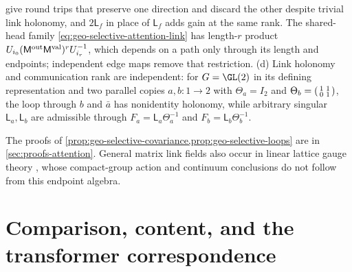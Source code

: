 give round trips that preserve one direction and discard the other despite
trivial link holonomy, and \(2\mathsf L_f\) in place of \(\mathsf L_f\) adds
gain at the same rank. The shared-head family
\eqref{eq:geo-selective-attention-link} has length-\(r\) product
\(U_{i_0}(\mathsf M^{\rm out}\mathsf M^{\rm val})^rU_{i_r}^{-1}\), which depends
on a path only through its length and endpoints; independent edge maps remove
that restriction. (d) Link holonomy and communication rank are independent: for
\(G=\GL(2)\) in its defining representation and two parallel copies
\(a,b:1\to2\) with \(\Theta_a=I_2\) and
\(\Theta_b=\begin{psmallmatrix}1&1\\0&1\end{psmallmatrix}\), the loop through
\(b\) and \(\bar a\) has nonidentity holonomy, while arbitrary singular
\(\mathsf L_a,\mathsf L_b\) are admissible through
\(F_a=\mathsf L_a\Theta_a^{-1}\) and \(F_b=\mathsf L_b\Theta_b^{-1}\).

The proofs of \cref{prop:geo-selective-covariance,prop:geo-selective-loops} are in \cref{sec:proofs-attention}.
General matrix link fields also occur in linear lattice gauge theory
\citep{Wetterich2014LinearLattice}, whose compact-group action and continuum
conclusions do not follow from this endpoint algebra.

\section{Comparison, content, and the transformer correspondence}
\label{sec:selective-comparison}

